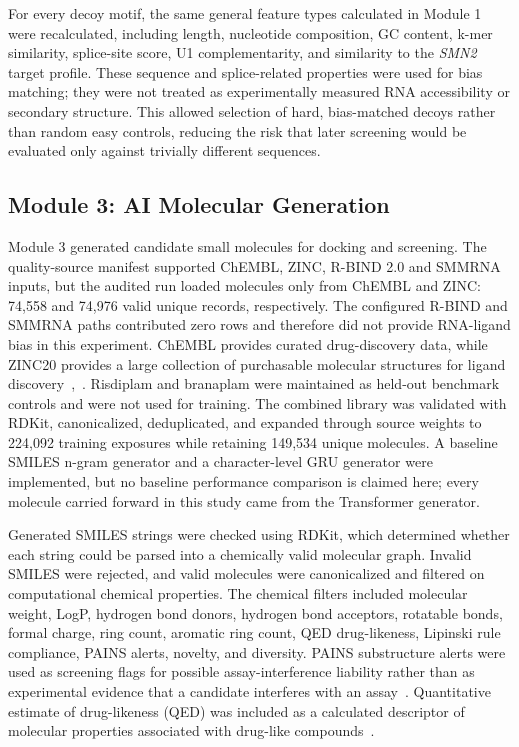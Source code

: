 \documentclass[journal]{IEEEtran}
\begin{document}
For every decoy motif, the same general feature types calculated in
Module 1 were recalculated, including length, nucleotide composition, GC
content, k-mer similarity, splice-site score, U1 complementarity, and
similarity to the \textit{SMN2} target profile. These sequence and
splice-related properties were used for bias matching; they were not
treated as experimentally measured RNA accessibility or secondary
structure. This allowed selection of hard, bias-matched decoys rather
than random easy controls, reducing the risk that later screening would
be evaluated only against trivially different sequences.

\subsection{Module 3: AI Molecular Generation}

Module 3 generated candidate small molecules for docking and screening.
The quality-source manifest supported ChEMBL, ZINC, R-BIND 2.0 and
SMMRNA inputs, but the audited run loaded molecules only from ChEMBL and
ZINC: 74{,}558 and 74{,}976 valid unique records, respectively. The
configured R-BIND and SMMRNA paths contributed zero rows and therefore
did not provide RNA-ligand bias in this experiment. ChEMBL provides
curated drug-discovery data, while ZINC20 provides a large collection of
purchasable molecular structures for ligand
discovery~\cite{zdrazil2024},~\cite{irwin2020}. Risdiplam and branaplam
were maintained as held-out benchmark controls and were not used for
training. The combined library was validated with RDKit, canonicalized,
deduplicated, and expanded through source weights to 224{,}092 training
exposures while retaining 149{,}534 unique molecules. A baseline SMILES
n-gram generator and a character-level GRU generator were implemented,
but no baseline performance comparison is claimed here; every molecule
carried forward in this study came from the Transformer generator.

Generated SMILES strings were checked using RDKit, which determined
whether each string could be parsed into a chemically valid molecular
graph. Invalid SMILES were rejected, and valid molecules were
canonicalized and filtered on computational chemical properties. The
chemical filters included molecular weight, LogP, hydrogen bond donors,
hydrogen bond acceptors, rotatable bonds, formal charge, ring count,
aromatic ring count, QED drug-likeness, Lipinski rule compliance, PAINS
alerts, novelty, and diversity. PAINS substructure alerts were used as
screening flags for possible assay-interference liability rather than as
experimental evidence that a candidate interferes with an
assay~\cite{baell2010}. Quantitative estimate of drug-likeness (QED) was
included as a calculated descriptor of molecular properties associated
with drug-like compounds~\cite{bickerton2012}.
\end{document}
